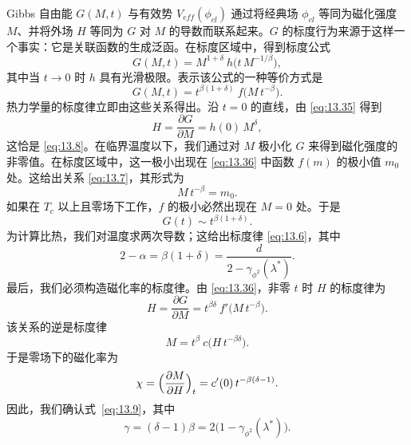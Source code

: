 Gibbs 自由能 $G(M, t)$ 与有效势 $V_{eff}(\phi_{cl})$ 通过将经典场 $\phi_{cl}$ 等同为磁化强度 $M$、并将外场 $H$ 等同为 $G$ 对 $M$ 的导数而联系起来。$G$ 的标度行为来源于这样一个事实：它是关联函数的生成泛函。在标度区域中，得到标度公式
\begin{equation}
  G(M, t) = M^{1+\delta}\ h\bigl( t\,M^{-1/\beta} \bigr) ,
  \label{eq:13.35}
\end{equation}
其中当 $t\to 0$ 时 $h$ 具有光滑极限。表示该公式的一种等价方式是
\begin{equation}
  G(M, t) = t^{\beta(1+\delta)}\ f\bigl( M\,t^{-\beta} \bigr) .
  \label{eq:13.36}
\end{equation}
热力学量的标度律立即由这些关系得出。沿 $t=0$ 的直线，由 \eqref{eq:13.35} 得到
\begin{equation}
  H = \frac{\partial G}{\partial M} = h(0)\,M^{\delta} ,
  \label{eq:13.37}
\end{equation}
这恰是 \eqref{eq:13.8}。在临界温度以下，我们通过对 $M$ 极小化 $G$ 来得到磁化强度的非零值。在标度区域中，这一极小出现在 \eqref{eq:13.36} 中函数 $f(m)$ 的极小值 $m_0$ 处。这给出关系 \eqref{eq:13.7}，其形式为
\begin{equation}
  M\,t^{-\beta} = m_0 .
  \label{eq:13.38}
\end{equation}
如果在 $T_c$ 以上且零场下工作，$f$ 的极小必然出现在 $M=0$ 处。于是
\begin{equation}
  G(t) \sim t^{\beta(1+\delta)} .
  \label{eq:13.39}
\end{equation}
为计算比热，我们对温度求两次导数；这给出标度律 \eqref{eq:13.6}，其中
\begin{equation}
  2 - \alpha = \beta(1+\delta) = \frac{d}{2 - \gamma_{\phi^2}(\lambda^{*})} .
  \label{eq:13.40}
\end{equation}
最后，我们必须构造磁化率的标度律。由 \eqref{eq:13.36}，非零 $t$ 时 $H$ 的标度律为
\begin{equation}
  H = \frac{\partial G}{\partial M} = t^{\beta\delta}\ f'\bigl( M\,t^{-\beta}
    \bigr) .
  \label{eq:13.41}
\end{equation}
该关系的逆是标度律
\begin{equation}
  M = t^{\beta}\ c\bigl( H\,t^{-\beta\delta} \bigr) .
  \label{eq:13.42}
\end{equation}
于是零场下的磁化率为
\begin{equation}
  \chi = \Bigl( \frac{\partial M}{\partial H} \Bigr)_t
  = c'(0)\,t^{-\beta(\delta-1)} .
  \label{eq:13.43}
\end{equation}
因此，我们确认式~\eqref{eq:13.9}，其中
\begin{equation}
  \gamma = (\delta-1)\beta = 2\bigl( 1 - \gamma_{\phi^2}(\lambda^{*}) \bigr) .
  \label{eq:13.44}
\end{equation}

